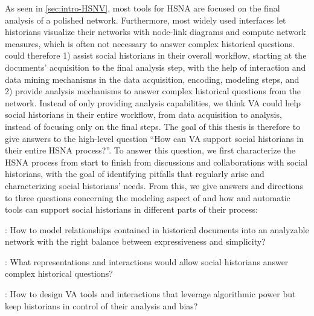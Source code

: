 As seen in \autoref{sec:intro-HSNV}, most \va tools for HSNA are focused on the final analysis of a polished network.
Furthermore, most widely used \snv interfaces let historians visualize their networks with node-link diagrams and compute network measures, which is often not necessary to answer complex historical questions.
\va could therefore 1) assist social historians in their overall workflow, starting at the documents' acquisition to the final analysis step, with the help of interaction and data mining mechanisms in the data acquisition, encoding, modeling steps, and 2) provide analysis mechanisms to answer complex historical questions from the network.
Instead of only providing analysis capabilities, we think VA could help social historians in their entire workflow, from data acquisition to analysis, instead of focusing only on the final steps.
The goal of this thesis is therefore to give answers to the high-level question ``How can VA support social historians in their entire HSNA process?''.
To answer this question, we first characterize the HSNA process from start to finish from discussions and collaborations with social historians, with the goal of identifying pitfalls that regularly arise and characterizing social historians' needs.
From this, we give answers and directions to three questions concerning the modeling aspect of \hsna and how \va and automatic tools can support social historians in different parts of their process:


\begin{description}
    \item \qone:  How to model relationships contained in historical documents into an analyzable network with the right balance between expressiveness and simplicity?
    \item \qtwo:  What representations and interactions would allow social historians answer complex historical questions?
    \item \qthree: How to design VA tools and interactions that leverage algorithmic power but keep historians in control of their analysis and bias?
\end{description}


